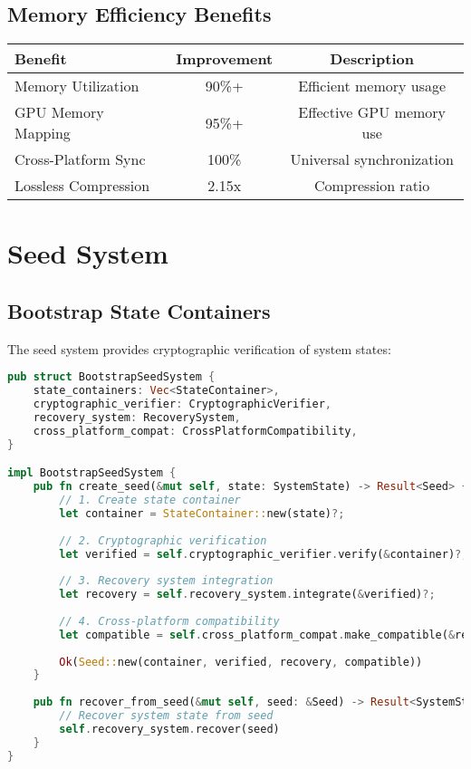 \documentclass[12pt,a4paper]{article}
\begin{document}
\subsection{Memory Efficiency Benefits}
\begin{center}
\begin{tabular}{|l|c|c|}
\hline
\textbf{Benefit} & \textbf{Improvement} & \textbf{Description} \\
\hline
Memory Utilization & 90\%+ & Efficient memory usage \\
GPU Memory Mapping & 95\%+ & Effective GPU memory use \\
Cross-Platform Sync & 100\% & Universal synchronization \\
Lossless Compression & 2.15x & Compression ratio \\
\hline
\end{tabular}
\end{center}

\newpage

\section{Seed System}

\subsection{Bootstrap State Containers}
The seed system provides cryptographic verification of system states:

\begin{lstlisting}[language=Rust, caption=Seed System Implementation]
pub struct BootstrapSeedSystem {
    state_containers: Vec<StateContainer>,
    cryptographic_verifier: CryptographicVerifier,
    recovery_system: RecoverySystem,
    cross_platform_compat: CrossPlatformCompatibility,
}

impl BootstrapSeedSystem {
    pub fn create_seed(&mut self, state: SystemState) -> Result<Seed> {
        // 1. Create state container
        let container = StateContainer::new(state)?;
        
        // 2. Cryptographic verification
        let verified = self.cryptographic_verifier.verify(&container)?;
        
        // 3. Recovery system integration
        let recovery = self.recovery_system.integrate(&verified)?;
        
        // 4. Cross-platform compatibility
        let compatible = self.cross_platform_compat.make_compatible(&recovery)?;
        
        Ok(Seed::new(container, verified, recovery, compatible))
    }
    
    pub fn recover_from_seed(&mut self, seed: &Seed) -> Result<SystemState> {
        // Recover system state from seed
        self.recovery_system.recover(seed)
    }
}
\end{lstlisting}
\end{document}
